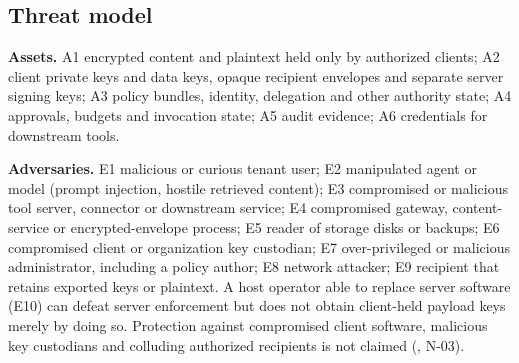 \subsection{Threat model}\label{sec:threats}
\textbf{Assets.} A1 encrypted content and plaintext held only by authorized clients; A2 client private keys and data keys, opaque recipient envelopes and separate server signing keys; A3 policy bundles, identity, delegation and other authority state; A4 approvals, budgets and invocation state; A5 audit evidence; A6 credentials for downstream tools.

\textbf{Adversaries.} E1 malicious or curious tenant user; E2 manipulated agent or model (prompt injection, hostile retrieved content); E3 compromised or malicious tool server, connector or downstream service; E4 compromised gateway, content-service or encrypted-envelope process; E5 reader of storage disks or backups; E6 compromised client or organization key custodian; E7 over-privileged or malicious administrator, including a policy author; E8 network attacker; E9 recipient that retains exported keys or plaintext. A host operator able to replace server software (E10) can defeat server enforcement but does not obtain client-held payload keys merely by doing so. Protection against compromised client software, malicious key custodians and colluding authorized recipients is not claimed (, N-03).

